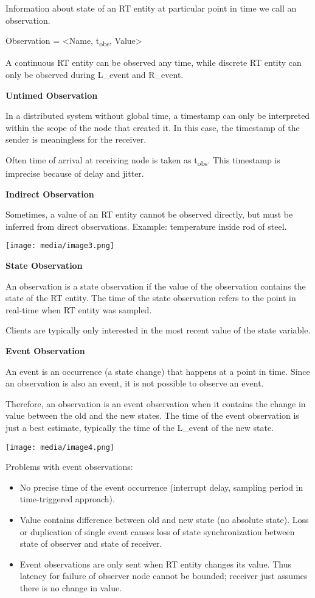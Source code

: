 Information about state of an RT entity at particular point in time we
call an observation.

Observation = \textless{}Name, t\textsubscript{obs}, Value\textgreater{}

A continuous RT entity can be observed any time, while discrete RT
entity can only be observed during L\_event and R\_event.

\textbf{Untimed Observation}

In a distributed system without global time, a timestamp can only be
interpreted within the scope of the node that created it. In this case,
the timestamp of the sender is meaningless for the receiver.

Often time of arrival at receiving node is taken as
t\textsubscript{obs}. This timestamp is imprecise because of delay and
jitter.

\textbf{Indirect Observation}

Sometimes, a value of an RT entity cannot be observed directly, but must
be inferred from direct observations. Example: temperature inside rod of
steel.

\texttt{[image: media/image3.png]}

\textbf{State Observation}

An observation is a state observation if the value of the observation
contains the state of the RT entity. The time of the state observation
refers to the point in real-time when RT entity was sampled.

Clients are typically only interested in the most recent value of the
state variable.

\textbf{Event Observation}

An event is an occurrence (a state change) that happens at a point in
time. Since an observation is also an event, it is not possible to
observe an event.

Therefore, an observation is an event observation when it contains the
change in value between the old and the new states. The time of the
event observation is just a best estimate, typically the time of the
L\_event of the new state.

\texttt{[image: media/image4.png]}

Problems with event observations:

\begin{itemize}
\item
  No precise time of the event occurrence (interrupt delay, sampling
  period in time-triggered approach).
\item
  Value contains difference between old and new state (no absolute
  state). Loss or duplication of single event causes loss of state
  synchronization between state of observer and state of receiver.
\item
  Event observations are only sent when RT entity changes its value.
  Thus latency for failure of observer node cannot be bounded; receiver
  just assumes there is no change in value.
\end{itemize}

